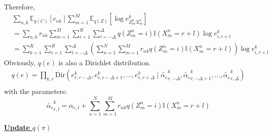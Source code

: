 \documentclass[12pt]{article}
\newenvironment{problem}[2][Problem]{\begin{trivlist}
\item[\hskip \labelsep {\bfseries #1}\hskip \labelsep {\bfseries #2.}]}{\end{trivlist}}
\begin{document}
\begin{problem}{2.8.24}
\begin{align*}
\end{align*}
Therefore,
\begin{align*}
    &\sum_{n,k}\mathbb{E}_{q(C)}[c_{nk}]\sum_{m=1}^{M}\mathbb{E}_{q(Z)}[\log e^k_{Z^n_{m}X^n_{m}}]\\
    &= \sum_{n,k}r_{nk}\sum_{m=1}^{M}\sum_{i=1}^{R}\sum_{l=-\Delta}^{\Delta}q(Z^n_{m}=i)\mathbb{I}(X^n_{m}=r+l)\log e^k_{i,r+l} \\
    &= \sum_{k=1}^{K}\sum_{i=1}^{R}\sum_{l=-\Delta}^{\Delta}
        (\sum_{n=1}^{N}\sum_{m=1}^{M}r_{nk}q(Z^n_{m}=i)\mathbb{I}(X^n_{m}=r+l))\log e^k_{i,r+l}
\end{align*}
Obviously, $q(e)$ is also a Dirichlet distribution.
\begin{align*}
    q(e) = \prod_{k,r} \mathrm{Dir}(e^k_{r,r-\Delta}, e^k_{r,r-\Delta+1}, ..., e^k_{r,r+\Delta}
        \mid \tilde{\alpha_{e}}^k_{r,-\Delta},\tilde{\alpha_{e}}^k_{r,-\Delta+1},...,\tilde{\alpha_{e}}^k_{r,\Delta}) \\
\end{align*}
with the parameters:
\begin{equation}
    \tilde{\alpha_{e}}^k_{r,l} = \alpha_{e,l} + \sum_{n=1}^{N}\sum_{m=1}^{M}r_{nk} q(Z^n_{m}=i)\mathbb{I}(X^n_{m}=r+l)
\end{equation}

\begin{flushleft}
    \textbf{\underline{Update $q(\pi)$}}
\end{flushleft}


\end{problem}
\end{document}
